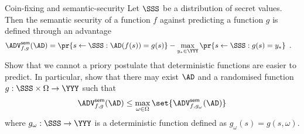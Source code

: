 \documentclass{crypto-exercise}
\author{Sven Laur}
\begin{document}
\begin{exercise}{Coin-fixing and semantic-security}
Let $\SSS$ be a distribution of secret values. Then the semantic security of a function $f$ against predicting a function $g$ is defined through an advantage
\begin{align*}
   \advSemXX{f,g}{\AD}%
   &=\pr{s\gets\SSS:\AD(f(s))=g(s)}
   -\max_{y_*\in\YYY}\pr{s\gets\SSS:g(s)=y_*}\enspace.
\end{align*}
Show that we cannot a priory postulate that deterministic functions are easier to predict. In particular, show that there may exist $\AD$ and a randomised function $g:\SSS\times\Omega\to\YYY$ such that   
\begin{align}
\label{eq:bound}
\advSemXX{f,g}{\AD}\leq \max_{\omega\in\Omega} \set{\advSemXX{f,g_\omega}{\AD}}
\end{align}
where $g_\omega:\SSS\to\YYY$ is a deterministic function defined as $g_\omega(s)=g(s,\omega)$. \end{exercise}
\end{document}
